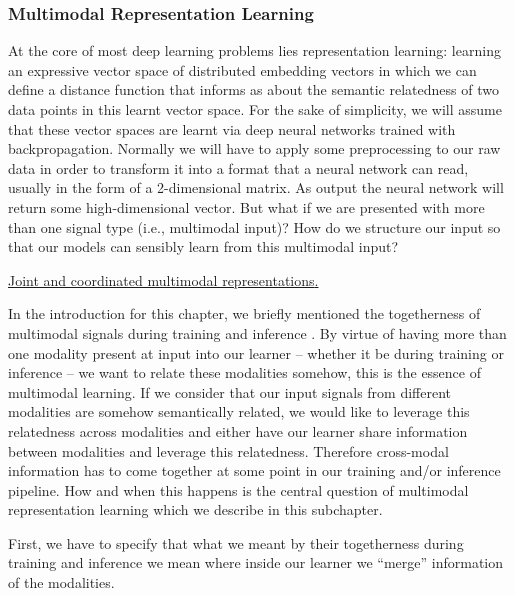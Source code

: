 \documentclass[
]{krantz}
\begin{document}
\hypertarget{multimodal-representation-learning}{%
\subsubsection{Multimodal Representation Learning}\label{multimodal-representation-learning}}

At the core of most deep learning problems lies representation learning: learning an expressive vector space of distributed embedding vectors in which we can define a distance function that informs as about the semantic relatedness of two data points in this learnt vector space. For the sake of simplicity, we will assume that these vector spaces are learnt via deep neural networks trained with backpropagation. Normally we will have to apply some preprocessing to our raw data in order to transform it into a format that a neural network can read, usually in the form of a 2-dimensional matrix. As output the neural network will return some high-dimensional vector. But what if we are presented with more than one signal type (i.e., multimodal input)? How do we structure our input so that our models can sensibly learn from this multimodal input?

\href{figures/03-01/joint-coordinated.png}{Joint and coordinated multimodal representations\citep{baltrušaitis2017multimodal}.}

In the introduction for this chapter, we briefly mentioned the togetherness of multimodal signals during training and inference \citep{DBLP:journals/pami/BengioCV13}. By virtue of having more than one modality present at input into our learner -- whether it be during training or inference -- we want to relate these modalities somehow, this is the essence of multimodal learning. If we consider that our input signals from different modalities are somehow semantically related, we would like to leverage this relatedness across modalities and either have our learner share information between modalities and leverage this relatedness. Therefore cross-modal information has to come together at some point in our training and/or inference pipeline. How and when this happens is the central question of multimodal representation learning which we describe in this subchapter.

First, we have to specify that what we meant by their togetherness during training and inference we mean where inside our learner we ``merge'' information of the modalities.
\end{document}
